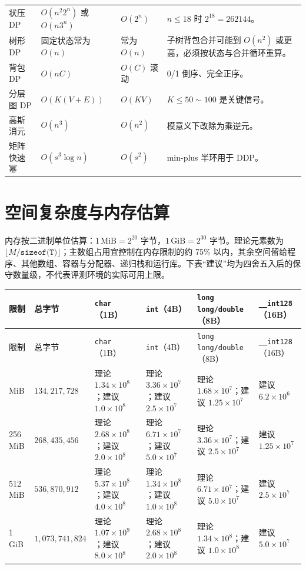 \documentclass[a4paper,11pt]{article}
\newcommand{\code}[1]{\texttt{#1}}
\begin{document}
\begin{longtable}{L{3cm} L{2.8cm} L{2.4cm} L{8cm}}
状压 DP & $O(n^2 2^n)$ 或 $O(n 3^n)$ & $O(2^n)$ & $n\le18$ 时 $2^{18}=262144$。\\[2mm]
树形 DP & 固定状态常为 $O(n)$ & 常为 $O(n)$ & 子树背包合并可能到 $O(n^2)$ 或更高，必须按状态与合并循环重算。\\[2mm]
背包 DP & $O(nC)$ & $O(C)$ 滚动 & 0/1 倒序、完全正序。\\[2mm]
分层图 DP & $O(K(V+E))$ & $O(KV)$ & $K\le50\sim100$ 是关键信号。\\[2mm]
高斯消元 & $O(n^3)$ & $O(n^2)$ & 模意义下改除为乘逆元。\\[2mm]
矩阵快速幂 & $O(s^3\log n)$ & $O(s^2)$ & min-plus 半环用于 DDP。\\
\end{longtable}
\endgroup

\section{空间复杂度与内存估算}

内存按二进制单位估算：$1\,\mathrm{MiB}=2^{20}$ 字节，$1\,\mathrm{GiB}=2^{30}$ 字节。理论元素数为 $\lfloor M/\code{sizeof(T)}\rfloor$；主数组占用宜控制在内存限制的约 75\% 以内，其余空间留给程序、其他数组、容器与分配器、递归栈和运行库。下表“建议”均为四舍五入后的保守数量级，不代表评测环境的实际可用上限。

\begingroup
\small
\begin{longtable}{L{1.6cm} L{2.6cm} L{2.8cm} L{3.0cm} L{3.2cm} L{2.5cm}}
\toprule
限制 & 总字节 & \code{char}（1B） & \code{int}（4B） & \code{long long/double}（8B） & \code{\_\_int128}（16B） \\
\midrule
\endfirsthead
\toprule
限制 & 总字节 & \code{char}（1B） & \code{int}（4B） & \code{long long/double}（8B） & \code{\_\_int128}（16B） \\
\midrule
\endhead
\endfoot
\bottomrule
{} MiB & $134{,}217{,}728$ & 理论 $1.34\times10^8$；建议 $1.0\times10^8$ & 理论 $3.36\times10^7$；建议 $2.5\times10^7$ & 理论 $1.68\times10^7$；建议 $1.25\times10^7$ & 建议 $6.2\times10^6$ \\
256 MiB & $268{,}435{,}456$ & 理论 $2.68\times10^8$；建议 $2.0\times10^8$ & 理论 $6.71\times10^7$；建议 $5.0\times10^7$ & 理论 $3.36\times10^7$；建议 $2.5\times10^7$ & 建议 $1.25\times10^7$ \\
512 MiB & $536{,}870{,}912$ & 理论 $5.37\times10^8$；建议 $4.0\times10^8$ & 理论 $1.34\times10^8$；建议 $1.0\times10^8$ & 理论 $6.71\times10^7$；建议 $5.0\times10^7$ & 建议 $2.5\times10^7$ \\
1 GiB & $1{,}073{,}741{,}824$ & 理论 $1.07\times10^9$；建议 $8.0\times10^8$ & 理论 $2.68\times10^8$；建议 $2.0\times10^8$ & 理论 $1.34\times10^8$；建议 $1.0\times10^8$ & 建议 $5.0\times10^7$ \\
\end{longtable}
\endgroup
\end{document}
